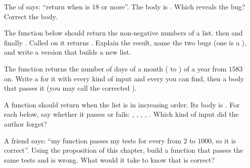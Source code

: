 \begin{exercise}[$\star$]\label{exo:g10:specifications-and-tests:5}
The  of  says: ``return  when  is $18$ or more''. The body is
. Which  reveals the bug? Correct the body.
\end{exercise}

\begin{exercise}[$\star\star$]\label{exo:g10:specifications-and-tests:6}
The function below should return the non-negative numbers of a list.
 then   and finally
. Called on \code{[-1, -2, 3]} it returns \code{[-2, 3]}. Explain the result, name the two bugs (one
is a ), and write a version that builds a new list.
\end{exercise}

\begin{exercise}[$\star\star$]\label{exo:g10:specifications-and-tests:7}
The function  returns the number of days of a month ( to ) of a
year from $1583$ on. Write a   for it with every kind of input and every  you
can find, then a body that passes it (you may call the corrected ).
\end{exercise}

\begin{exercise}[$\star\star$]\label{exo:g10:specifications-and-tests:8}
A function  should return  when the list  is in increasing order. Its body is
. For each  below, say whether it passes or fails:
\code{[]}, \code{[4]}, \code{[1, 2, 3]}, \code{[3, 2, 1]}, \code{[1, 5, 2, 6]}. Which kind of input did the author
forget?
\end{exercise}

\begin{exercise}[$\star\star$]\label{exo:g10:specifications-and-tests:9}
A friend says: ``my function  passes my tests for every  from $2$ to $1000$, so it is
correct''. Using the proposition of this chapter, build a function that passes the same tests and is wrong. What
would it take to know that  is correct?
\end{exercise}

